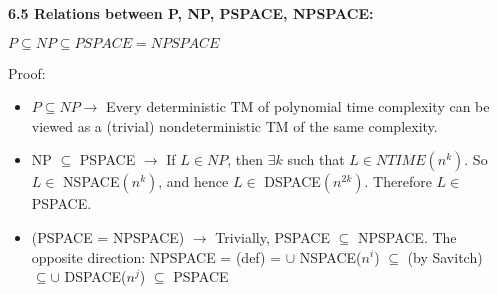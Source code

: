 \documentclass{article}
\begin{document}
\begin{multicols}{2}
\textbf{6.5 Relations between P, NP, PSPACE, NPSPACE:}
\begin{center}
    $P \subseteq NP \subseteq PSPACE = NPSPACE$
\end{center}
Proof:
\begin{itemize}
    \setlength\itemsep{-0.4em}
    \item $P \subseteq NP \rightarrow$ Every deterministic TM of polynomial time complexity can be viewed as a (trivial) nondeterministic TM of the same complexity.
    \item NP $\subseteq$ PSPACE $\rightarrow$ If $L \in NP$, then $\exists k$ such that $L \in NTIME(n^k)$. So $L \in$ NSPACE$(n^k)$, and hence $L \in$ DSPACE$(n^{2k})$. Therefore $L \in $ PSPACE.
    \item (PSPACE = NPSPACE) $\rightarrow$ Trivially, PSPACE $\subseteq$ NPSPACE. \small{The opposite direction:
    NPSPACE = (def) = $\cup$ NSPACE($n^i$) $\subseteq$ (by Savitch) $\subseteq \cup$ DSPACE($n^j$) $\subseteq$ PSPACE}
 \end{itemize}

\end{multicols}
\end{document}
